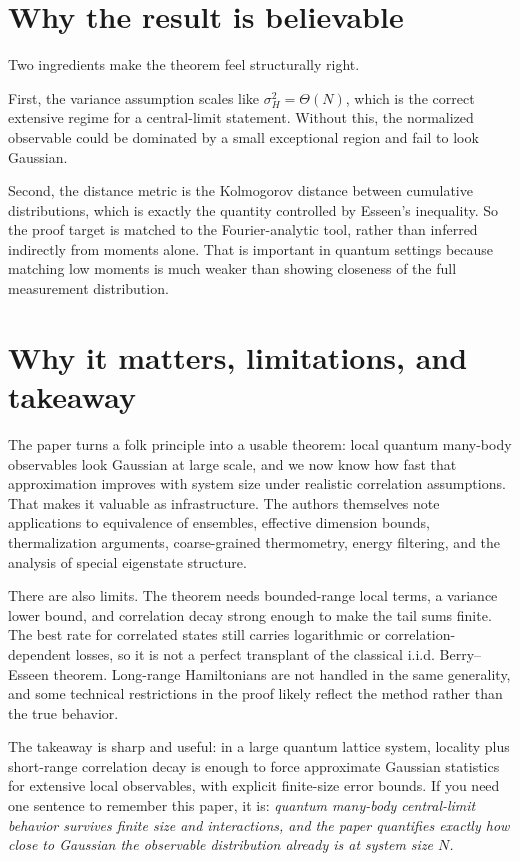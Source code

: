 \documentclass[11pt]{article}
\begin{document}
\section*{Why the result is believable}
Two ingredients make the theorem feel structurally right.

First, the variance assumption scales like $\sigma_H^2 = \Theta(N)$, which is the correct extensive regime for a central-limit statement. Without this, the normalized observable could be dominated by a small exceptional region and fail to look Gaussian.

Second, the distance metric is the Kolmogorov distance between cumulative distributions, which is exactly the quantity controlled by Esseen's inequality. So the proof target is matched to the Fourier-analytic tool, rather than inferred indirectly from moments alone. That is important in quantum settings because matching low moments is much weaker than showing closeness of the full measurement distribution.

\section*{Why it matters, limitations, and takeaway}
The paper turns a folk principle into a usable theorem: local quantum many-body observables look Gaussian at large scale, and we now know how fast that approximation improves with system size under realistic correlation assumptions. That makes it valuable as infrastructure. The authors themselves note applications to equivalence of ensembles, effective dimension bounds, thermalization arguments, coarse-grained thermometry, energy filtering, and the analysis of special eigenstate structure.

There are also limits. The theorem needs bounded-range local terms, a variance lower bound, and correlation decay strong enough to make the tail sums finite. The best rate for correlated states still carries logarithmic or correlation-dependent losses, so it is not a perfect transplant of the classical i.i.d. Berry--Esseen theorem. Long-range Hamiltonians are not handled in the same generality, and some technical restrictions in the proof likely reflect the method rather than the true behavior.

The takeaway is sharp and useful: in a large quantum lattice system, locality plus short-range correlation decay is enough to force approximate Gaussian statistics for extensive local observables, with explicit finite-size error bounds. If you need one sentence to remember this paper, it is: \emph{quantum many-body central-limit behavior survives finite size and interactions, and the paper quantifies exactly how close to Gaussian the observable distribution already is at system size $N$.}
\end{document}
